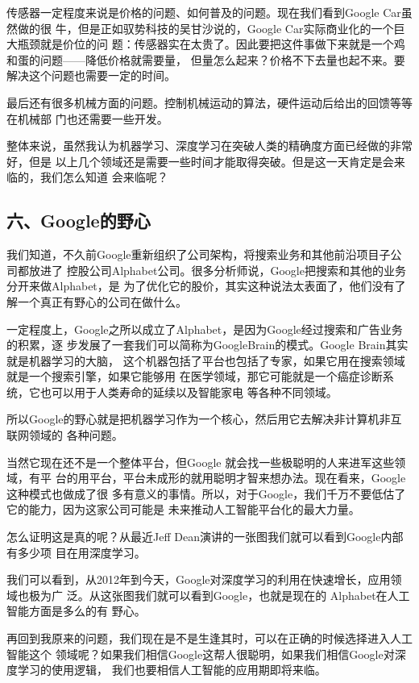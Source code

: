 \documentclass[11pt]{ctexart}
\begin{document}
{{{{传感器一定程度来说是价格的问题、如何普及的问题。现在我们看到Google Car虽然做的很
牛，但是正如驭势科技的吴甘沙说的，Google Car实际商业化的一个巨大瓶颈就是价位的问
题：传感器实在太贵了。因此要把这件事做下来就是一个鸡和蛋的问题——降低价格就需要量，
但量怎么起来？价格不下去量也起不来。要解决这个问题也需要一定的时间。

最后还有很多机械方面的问题。控制机械运动的算法，硬件运动后给出的回馈等等在机械部
门也还需要一些开发。

整体来说，虽然我认为机器学习、深度学习在突破人类的精确度方面已经做的非常好，但是
以上几个领域还是需要一些时间才能取得突破。但是这一天肯定是会来临的，我们怎么知道
会来临呢？

\subsection{六、Google的野心}
\label{sec:org1fc405d}

我们知道，不久前Google重新组织了公司架构，将搜索业务和其他前沿项目子公司都放进了
控股公司Alphabet公司。很多分析师说，Google把搜索和其他的业务分开来做Alphabet，是
为了优化它的股价，其实这种说法太表面了，他们没有了解一个真正有野心的公司在做什么。

一定程度上，Google之所以成立了Alphabet，是因为Google经过搜索和广告业务的积累，逐
步发展了一套我们可以简称为GoogleBrain的模式。Google Brain其实就是机器学习的大脑，
这个机器包括了平台也包括了专家，如果它用在搜索领域就是一个搜索引擎，如果它能够用
在医学领域，那它可能就是一个癌症诊断系统，它也可以用于人类寿命的延续以及智能家电
等各种不同领域。

所以Google的野心就是把机器学习作为一个核心，然后用它去解决非计算机非互联网领域的
各种问题。

当然它现在还不是一个整体平台，但Google 就会找一些极聪明的人来进军这些领域，有平
台的用平台，平台未成形的就用聪明才智来想办法。现在看来，Google这种模式也做成了很
多有意义的事情。所以，对于Google，我们千万不要低估了它的能力，因为这家公司可能是
未来推动人工智能平台化的最大力量。

怎么证明这是真的呢？从最近Jeff Dean演讲的一张图我们就可以看到Google内部有多少项
目在用深度学习。


我们可以看到，从2012年到今天，Google对深度学习的利用在快速增长，应用领域也极为广
泛。从这张图我们就可以看到Google，也就是现在的 Alphabet在人工智能方面是多么的有
野心。

再回到我原来的问题，我们现在是不是生逢其时，可以在正确的时候选择进入人工智能这个
领域呢？如果我们相信Google这帮人很聪明，如果我们相信Google对深度学习的使用逻辑，
我们也要相信人工智能的应用期即将来临。

}}}}
\end{document}
